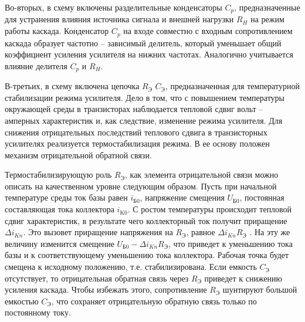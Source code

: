 Во-вторых, в схему включены разделительные конденсаторы $C_p$, предназначенные для устранения влияния источника сигнала и внешней нагрузки $R_H$ на режим работы каскада. Конденсатор $C_p$ на входе совместно с входным сопротивлением каскада образует частотно – зависимый делитель, который уменьшает общий коэффициент усиления усилителя на нижних частотах. Аналогично учитывается влияние делителя $C_p$ и $R_H$. 

В-третьих, в схему включена цепочка $R_{\text{Э}}$ $C_{\text{Э}}$, предназначенная для температурной стабилизации режима  усилителя. Дело в том, что с повышением температуры окружающей среды в транзисторах наблюдается тепловой сдвиг вольт – амперных характеристик и, как следствие, изменение режима усилителя. Для снижения отрицательных последствий теплового сдвига в транзисторных усилителях реализуется термостабилизация режима. В ее основу положен механизм отрицательной обратной связи.

Термостабилизирующую роль $R_{\text{Э}}$, как элемента отрицательной связи можно описать на качественном уровне следующим образом. Пусть при начальной температуре среды ток базы равен $i_{\text{Б0}}$, напряжение смещения $U_{\text{Б0}}$, постоянная составляющая тока коллектора $i_{\text{K0}}$. С ростом температуры происходит тепловой сдвиг характеристик, в результате чего коллекторный ток получит приращение $\Delta i_{Kn}$. Это вызовет приращение напряжения на $R_{\text{Э}}$, равное $\Delta i_{Kn}R_{\text{Э}}$ . На эту же величину изменится смещение $U_{\text{Б0}}-\Delta i_{Kn}R_{\text{Э}}$, что приведет к уменьшению тока базы и к соответствующему уменьшению тока коллектора. Рабочая точка будет смещена к исходному положению, т.е. стабилизирована. Если емкость $C_{\text{Э}}$ отсутствует, то отрицательная обратная связь через $R_{\text{Э}}$ приведет к снижению усиления каскада. Чтобы избежать этого, сопротивление $R_{\text{Э}}$ шунтируют большой емкостью $C_{\text{Э}}$, что сохраняет отрицательную обратную связь только по постоянному току.



